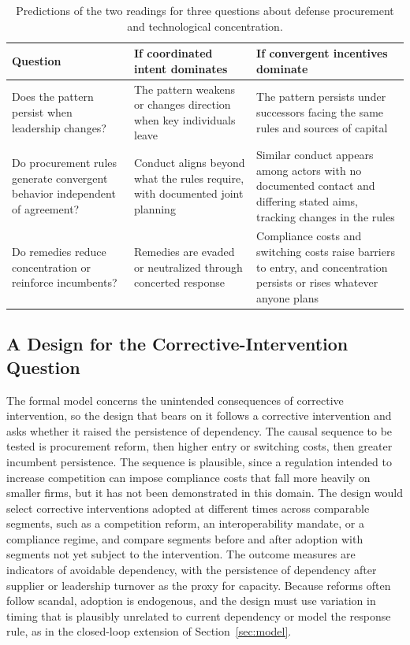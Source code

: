 \documentclass[12pt]{article}
\theoremstyle{remark}
\begin{document}
\begin{table}[ht]
\centering
\small
\setlength{\tabcolsep}{4pt}
\begin{tabular}{p{1.6in}p{2.3in}p{2.3in}}
\hline
Question & If coordinated intent dominates & If convergent incentives dominate \\
\hline
Does the pattern persist when leadership changes? & The pattern weakens or changes direction when key individuals leave & The pattern persists under successors facing the same rules and sources of capital \\
Do procurement rules generate convergent behavior independent of agreement? & Conduct aligns beyond what the rules require, with documented joint planning & Similar conduct appears among actors with no documented contact and differing stated aims, tracking changes in the rules \\
Do remedies reduce concentration or reinforce incumbents? & Remedies are evaded or neutralized through concerted response & Compliance costs and switching costs raise barriers to entry, and concentration persists or rises whatever anyone plans \\
\hline
\end{tabular}
\caption{Predictions of the two readings for three questions about defense procurement and technological concentration.}
\label{tab:case}
\end{table}

\subsection{A Design for the Corrective-Intervention Question}

The formal model concerns the unintended consequences of corrective intervention, so the design that bears on it follows a corrective intervention and asks whether it raised the persistence of dependency. The causal sequence to be tested is procurement reform, then higher entry or switching costs, then greater incumbent persistence. The sequence is plausible, since a regulation intended to increase competition can impose compliance costs that fall more heavily on smaller firms, but it has not been demonstrated in this domain. The design would select corrective interventions adopted at different times across comparable segments, such as a competition reform, an interoperability mandate, or a compliance regime, and compare segments before and after adoption with segments not yet subject to the intervention. The outcome measures are indicators of avoidable dependency, with the persistence of dependency after supplier or leadership turnover as the proxy for capacity. Because reforms often follow scandal, adoption is endogenous, and the design must use variation in timing that is plausibly unrelated to current dependency or model the response rule, as in the closed-loop extension of Section~\ref{sec:model}.
\end{document}
